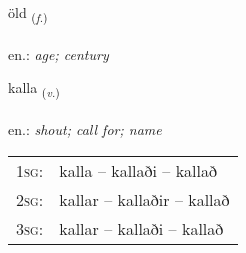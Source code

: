 \documentclass[frontgrid, backgrid]{flacards}\usepackage[]{graphicx}\usepackage[]{xcolor}
\begin{document}
\renewcommand{\blhead}{\vskip5pt {\small\bfseries\footnotesize Nafnorð | Noun }}
\renewcommand{\bcfoot}{\vskip5pt \hspace{2pt}{\small\bfseries\footnotesize 1K}}


{öld \small{\textsubscript{(\textit{f.})}} \\[1ex] %
\textphonetic{[œlt]} \\
en.: \emph{age; century} \\  [2ex]
\renewcommand*{\arraystretch}{0.8}
}

\renewcommand{\flhead}{\vskip5pt \fboxsep=0pt {\small\bfseries\footnotesize Sagnorð | Verb}}
\renewcommand{\fcfoot}{\vskip5pt \fboxsep=0pt \hspace{2pt}{\small\bfseries\footnotesize 1K}}

\renewcommand{\blhead}{\vskip5pt {\small\bfseries\footnotesize Sagnorð | Verb }}
\renewcommand{\bcfoot}{\vskip5pt \hspace{2pt}{\small\bfseries\footnotesize 1K}}


{kalla \small{\textsubscript{(\textit{v.})}} \\[1ex] %
\textphonetic{[kʰatla]} \\
en.: \emph{shout; call for; name} \\  [2ex]
\renewcommand*{\arraystretch}{0.8}
\begin{tabular}{p{1cm}l}
\textsc{1sg}: & kalla -- kallaði -- kallað \\ 
\textsc{2sg}: & kallar -- kallaðir -- kallað \\ 
\textsc{3sg}: & kallar -- kallaði -- kallað \\ 
\end{tabular}
}

\renewcommand{\flhead}{\vskip5pt \fboxsep=0pt {\small\bfseries\footnotesize Nafnorð | Noun}}
\renewcommand{\fcfoot}{\vskip5pt \fboxsep=0pt \hspace{2pt}{\small\bfseries\footnotesize 1K}}
\end{document}
